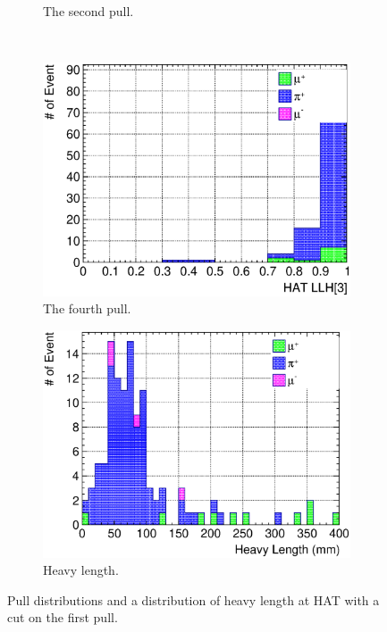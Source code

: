 \begin{figure}
\begin{subfigure}{\dbfigwid\textwidth}
                    \caption{The second pull.}
                    \label{subfig:sppi-pulls-2-pid0}
               \end{subfigure}
               \\
               \begin{subfigure}{\dbfigwid\textwidth}
                    \includegraphics[width=\textwidth]{figures/sel/sspi_TOP_hat_pid3_stack_al5_pid0.eps}
                    \caption{The fourth pull.}
                    \label{subfig:sppi-pulls-4-pid0}
               \end{subfigure}
               \begin{subfigure}{\dbfigwid\textwidth}
                    \includegraphics[width=\textwidth]{figures/sel/sspi_TOP_trk_heavylen_stack_al5_pid0.eps}
                    \caption{Heavy length.}
                    \label{subfig:sppi-heavylen-pid0}
               \end{subfigure}
               \caption{Pull distributions and a distribution of heavy length at HAT with a cut on the first pull.}
               \label{fig:pulls-pid0}
          \end{figure}


